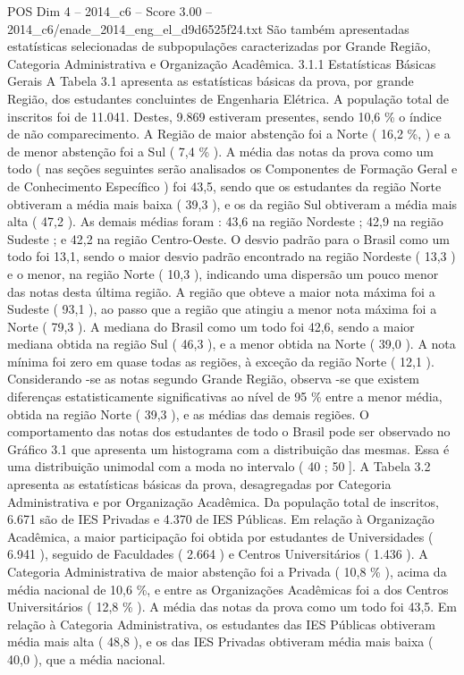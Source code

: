 \begin{textsample}{POS Dim 4 – 2014\_c6 – Score 3.00 – 2014\_c6/enade\_2014\_eng\_el\_d9d6525f24.txt}
São também apresentadas estatísticas selecionadas de subpopulações caracterizadas por Grande Região, Categoria Administrativa e Organização Acadêmica. 3.1.1 Estatísticas Básicas Gerais A Tabela 3.1 apresenta as estatísticas básicas da prova, por grande Região, dos estudantes concluintes de Engenharia Elétrica.
A população total de inscritos foi de 11.041.
Destes, 9.869 estiveram presentes, sendo 10,6 \% o índice de não comparecimento.
A Região de maior abstenção foi a Norte ( 16,2 \%, ) e a de menor abstenção foi a Sul ( 7,4 \% ).
A média das notas da prova como um todo ( nas seções seguintes serão analisados os Componentes de Formação Geral e de Conhecimento Específico ) foi 43,5, sendo que os estudantes da região Norte obtiveram a média mais baixa ( 39,3 ), e os da região Sul obtiveram a média mais alta ( 47,2 ).
As demais médias foram : 43,6 na região Nordeste ; 42,9 na região Sudeste ; e 42,2 na região Centro-Oeste.
O desvio padrão para o Brasil como um todo foi 13,1, sendo o maior desvio padrão encontrado na região Nordeste ( 13,3 ) e o menor, na região Norte ( 10,3 ), indicando uma dispersão um pouco menor das notas desta última região.
A região que obteve a maior nota máxima foi a Sudeste ( 93,1 ), ao passo que a região que atingiu a menor nota máxima foi a Norte ( 79,3 ).
A mediana do Brasil como um todo foi 42,6, sendo a maior mediana obtida na região Sul ( 46,3 ), e a menor obtida na Norte ( 39,0 ).
A nota mínima foi zero em quase todas as regiões, à exceção da região Norte ( 12,1 ).
Considerando -se as notas segundo Grande Região, observa -se que existem diferenças estatisticamente significativas ao nível de 95 \% entre a menor média, obtida na região Norte ( 39,3 ), e as médias das demais regiões.
O comportamento das notas dos estudantes de todo o Brasil pode ser observado no Gráfico 3.1 que apresenta um histograma com a distribuição das mesmas.
Essa é uma distribuição unimodal com a moda no intervalo ( 40 ; 50 ].
A Tabela 3.2 apresenta as estatísticas básicas da prova, desagregadas por Categoria Administrativa e por Organização Acadêmica.
Da população total de inscritos, 6.671 são de IES Privadas e 4.370 de IES Públicas.
Em relação à Organização Acadêmica, a maior participação foi obtida por estudantes de Universidades ( 6.941 ), seguido de Faculdades ( 2.664 ) e Centros Universitários ( 1.436 ).
A Categoria Administrativa de maior abstenção foi a Privada ( 10,8 \% ), acima da média nacional de 10,6 \%, e entre as Organizações Acadêmicas foi a dos Centros Universitários ( 12,8 \% ).
A média das notas da prova como um todo foi 43,5.
Em relação à Categoria Administrativa, os estudantes das IES Públicas obtiveram média mais alta ( 48,8 ), e os das IES Privadas obtiveram média mais baixa ( 40,0 ), que a média nacional.

\end{textsample}
